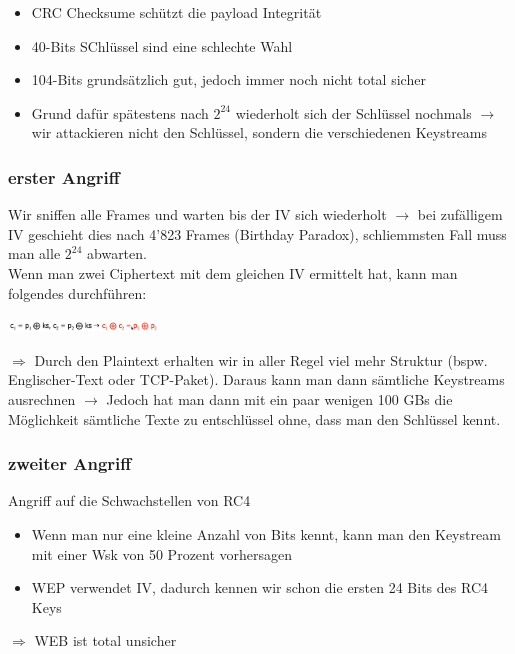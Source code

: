 \documentclass{report}
\newenvironment{Figure}
	{\par\medskip\noindent\minipage{\linewidth}}
	{\endminipage\par\medskip}
\theoremstyle{definition}
\theoremstyle{example}
\begin{document}
\begin{itemize}
	\item CRC Checksume schützt die payload Integrität
	\item 40-Bits SChlüssel sind eine schlechte Wahl
	\item 104-Bits grundsätzlich gut, jedoch immer noch nicht total sicher
	\item Grund dafür spätestens nach $2^24$ wiederholt sich der Schlüssel nochmals $\rightarrow$ wir attackieren nicht den Schlüssel, sondern die verschiedenen Keystreams
\end{itemize}

		\subsubsection{erster Angriff}
Wir sniffen alle Frames und warten bis der IV sich wiederholt $\rightarrow$ bei zufälligem IV geschieht dies nach 4'823 Frames (Birthday Paradox), schliemmsten Fall muss man alle $2^24$ abwarten.\\
Wenn man zwei Ciphertext mit dem gleichen IV ermittelt hat, kann man folgendes durchführen:
\begin{Figure}
\centering
\includegraphics[width=150px]{img/FormelIV.png}
	\label{fig:Die Formel für das Erkennen des Ciphertexts}
\end{Figure}
$\Rightarrow$ Durch den Plaintext erhalten wir in aller Regel viel mehr Struktur (bspw. Englischer-Text oder TCP-Paket). Daraus kann man dann sämtliche Keystreams ausrechnen $\rightarrow$ Jedoch hat man dann mit ein paar wenigen 100 GBs die Möglichkeit sämtliche Texte zu entschlüssel ohne, dass man den Schlüssel kennt.

		\subsubsection{zweiter Angriff}
Angriff auf die Schwachstellen von RC4
\begin{itemize}
	\item Wenn man nur eine kleine Anzahl von Bits kennt, kann man den Keystream mit einer Wsk von 50 Prozent vorhersagen
	\item WEP verwendet IV, dadurch kennen wir schon die ersten 24 Bits des RC4 Keys
\end{itemize}
$\Rightarrow$ WEB ist total unsicher
\end{document}
